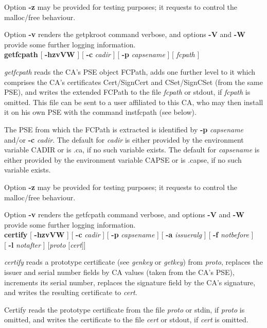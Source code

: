 Option {\bf -z} may be provided for testing purposes; it requests to control the malloc/free behaviour.

Option {\bf -v} renders the getpkroot command verbose, and options {\bf -V} and {\bf -W} provide some further logging information.
\\ [1em]
{\bf getfcpath} [ {\bf -hzvVW} ] [ {\bf -c} {\em cadir} ] [ {\bf -p} {\em capsename} ] [ {\em fcpath} ]

{\em getfcpath} reads the CA's PSE object FCPath, adds one further level
to it which comprises the CA's certificates Cert/SignCert and CSet/SignCSet (from the same PSE), and writes the 
extended FCPath
to the file {\em fcpath} or stdout, if {\em fcpath} is omitted. This file can be sent to a user 
affiliated to this
CA, who may then install it on his own PSE with the command instfcpath (see below). 
 
The PSE from which the FCPath is extracted is identified by {\bf -p} {\em capsename} and/or
{\bf -c} {\em cadir}. 
The default for {\em cadir} is either provided by the environment variable
CADIR or is .ca, if no such variable exists.
The default for {\em capsename} is either provided by the environment variable
CAPSE or is .capse, if no such variable exists.
 
Option {\bf -z} may be provided for testing purposes; it requests to control the malloc/free behaviour.

Option {\bf -v} renders the getfcpath command verbose, and options {\bf -V} and {\bf -W} 
provide some further logging information.
\\ [1em]
{\bf certify} [ {\bf -hzvVW} ] [ {\bf -c} {\em cadir} ] [ {\bf -p} {\em capsename} ] [ {\bf -a} {\em issueralg} ] [ {\bf -f} {\em notbefore} ] \\
\hspace*{2cm} [ {\bf -l} {\em notafter} ] [{\em proto} [{\em cert}]]

{\em certify} reads a prototype certificate (see {\em genkey} or {\em getkey}) from {\em proto},
replaces the issuer and serial number fields by CA values (taken from the CA's PSE), increments its 
serial number,
replaces the signature field by the CA's signature, and writes the resulting
certificate to {\em cert}. 

Certify reads the prototype certificate
from the file {\em proto} or stdin, if {\em proto} is omitted, and writes the certificate
to the file {\em cert} or stdout, if {\em cert} is omitted. 


